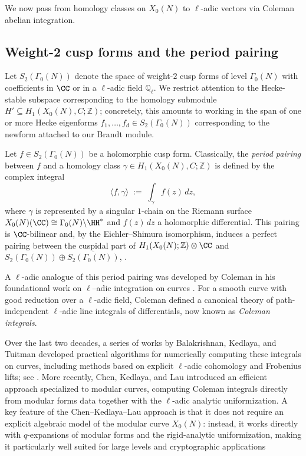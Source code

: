 \documentclass[10pt]{amsart}
\theoremstyle{theostyle}
\newcommand{\QQ}{\mathbb{Q}} \newcommand{\RR}{\mathbb{R}}
\newcommand{\ZZ}{\mathbb{Z}}
\begin{document}
We now pass from homology classes on $X_0(N)$ to $\ell$-adic vectors via
Coleman abelian integration. 

\subsection{Weight-2 cusp forms and the period pairing}

Let $S_2(\Gamma_0(N))$ denote the space of weight-$2$ cusp forms of level
$\Gamma_0(N)$ with coefficients in $\CC$ or in a $\ell$-adic field $\QQ_\ell$.
We restrict attention to the Hecke-stable subspace corresponding to the
homology submodule $H' \subseteq H_1(X_0(N),C;\ZZ)$; concretely, this amounts
to working in the span of one or more Hecke eigenforms
$f_1,\dots,f_d \in S_2(\Gamma_0(N))$ corresponding to the newform attached to
our Brandt module.

Let $f \in S_2(\Gamma_0(N))$ be a holomorphic cusp form.
Classically, the \emph{period pairing} between $f$ and a homology class
$\gamma \in H_1(X_0(N),C;\ZZ)$ is defined by the complex integral
\[
\langle f,\gamma\rangle
\;:=\;
\int_\gamma f(z)\,dz,
\]
where $\gamma$ is represented by a singular $1$-chain on the Riemann surface
$X_0(N)(\CC)\cong \Gamma_0(N)\backslash\HH^\ast$ and $f(z)\,dz$ a holomorphic differential.
This pairing is $\CC$-bilinear and, by the Eichler--Shimura isomorphism,
induces a perfect pairing between the cuspidal part of
$H_1(X_0(N);\ZZ)\otimes\CC$ and $S_2(\Gamma_0(N))\oplus \overline{S_2(\Gamma_0(N))}$, \cite[\S~8]{Stein:ModularForms}.

A $\ell$-adic analogue of this period pairing was developed by Coleman in his
foundational work on $\ell$--adic integration on curves
\cite{Coleman:Integrals}. For a smooth curve with good reduction over a
$\ell$-adic field, Coleman defined a canonical theory of path-independent
$\ell$-adic line integrals of differentials, now known as
\emph{Coleman integrals}.

Over the last two decades, a series of works by Balakrishnan, Kedlaya, and
Tuitman developed practical algorithms for numerically computing these
integrals on curves, including methods based on explicit $\ell$-adic
cohomology and Frobenius lifts; see
\cite{BalaKedla:Integrals,Bala:ExplicitColeman,Tuitman:MapP}.
More recently, Chen, Kedlaya, and Lau \cite{CKL} introduced an efficient
approach specialized to modular curves, computing Coleman integrals directly
from modular forms data together with the
$\ell$-adic analytic uniformization.
A key feature of the Chen--Kedlaya--Lau approach is that it does not
require an explicit algebraic model of the modular curve $X_0(N)$:
instead, it works directly with $q$-expansions of modular forms and the
rigid-analytic uniformization, making it particularly well suited for
large levels and cryptographic applications
\end{document}
